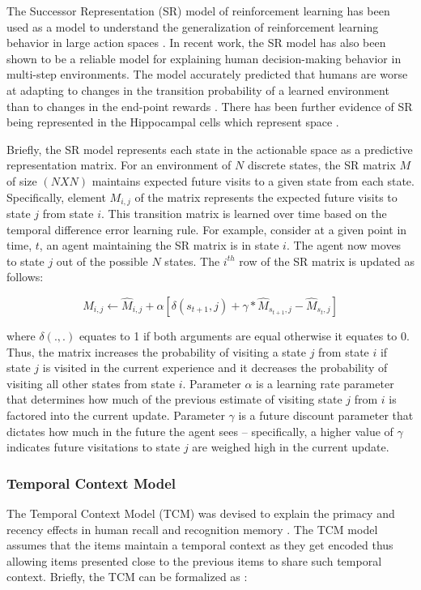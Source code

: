 The Successor Representation (SR) model of reinforcement learning has been used as a model to understand the generalization of reinforcement learning behavior in large action spaces \cite{dayan1993improving}. In recent work, the SR model has also been shown to be a reliable model for explaining human decision-making behavior in multi-step environments. The model accurately predicted that humans are worse at adapting to changes in the transition probability of a learned environment than to changes in the end-point rewards \cite{momennejad2017successor}. There has been further evidence of SR being represented in the Hippocampal cells which represent space \cite{gershman2018successor, stachenfeld2017hippocampus}.

Briefly, the SR model represents each state in the actionable space as a predictive representation matrix. For an environment of $N$ discrete states, the SR matrix $M$ of size $(N X N)$ maintains expected future visits to a given state from each state. Specifically, element $M_{i,j}$ of the matrix represents the expected future visits to state $j$ from state $i$. This transition matrix is learned over time based on the temporal difference error learning rule. For example, consider at a given point in time, $t$, an agent maintaining the SR matrix is in state $i$. The agent now moves to state $j$ out of the possible $N$ states. The $i^{th}$ row of the SR matrix is updated as follows:

\begin{equation}
	M_{i,j} \leftarrow \hat{M}_{i,j} + \alpha[\delta(s_{t+1},j) + \gamma*\hat{M}_{s_{t+1},j} - \hat{M}_{s_t,j}]
\end{equation}

where $\delta(., .)$ equates to 1 if both arguments are equal otherwise it equates to 0. Thus, the matrix increases the probability of visiting a state $j$ from state $i$ if state $j$ is visited in the current experience and it decreases the probability of visiting all other states from state $i$. Parameter $\alpha$ is a learning rate parameter that determines how much of the previous estimate of visiting state $j$ from $i$ is factored into the current update. Parameter $\gamma$ is a future discount parameter that dictates how much in the future the agent sees -- specifically, a higher value of $\gamma$ indicates future visitations to state $j$ are weighed high in the current update.

\subsubsection{Temporal Context Model}
The Temporal Context Model (TCM) was devised to explain the primacy and recency effects in human recall and recognition memory \cite{howard2005temporal}. The TCM model assumes that the items maintain a temporal context as they get encoded thus allowing items presented close to the previous items to share such temporal context. Briefly, the TCM can be formalized as \cite{gershman2012successor}:

